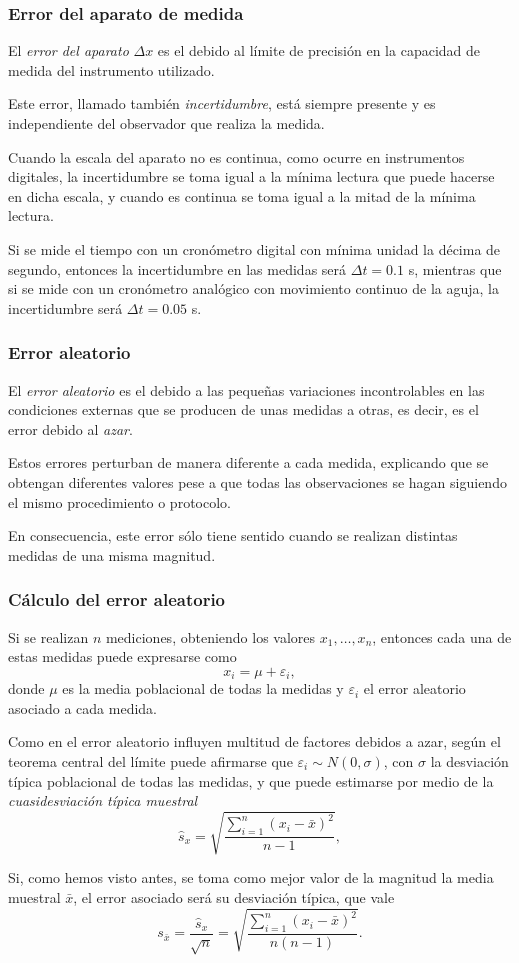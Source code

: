\begin{frame}
	\frametitle{Error del aparato de medida }
	El \emph{error del aparato} $\Delta x$ es el debido al límite de precisión en la capacidad de medida del instrumento
	utilizado. 
	
	Este error, llamado también \emph{incertidumbre}, está siempre presente y es independiente del observador
	que realiza la medida.
	
	Cuando la escala del aparato no es continua, como ocurre en instrumentos digitales, la incertidumbre se toma igual a la
	mínima lectura que puede hacerse en dicha escala, y cuando es continua se toma igual a la mitad de la mínima lectura.
	
	 Si se mide el tiempo con un cronómetro digital con mínima unidad la décima de segundo,
	entonces la incertidumbre en las medidas será $\Delta t=0.1$ s, mientras que si se mide con un cronómetro analógico con
	movimiento continuo de la aguja, la incertidumbre será $\Delta t=0.05$ s.
\end{frame}


\begin{frame}
	\frametitle{Error aleatorio}
	El \emph{error aleatorio} es el debido a las pequeñas variaciones incontrolables en las condiciones externas que se
	producen de unas medidas a otras, es decir, es el error debido al \emph{azar}. 
	
	Estos errores perturban de manera diferente a cada medida, explicando que se obtengan diferentes valores pese a que
	todas las observaciones se hagan siguiendo el mismo procedimiento o protocolo.
	
	En consecuencia, este error sólo tiene sentido cuando se realizan distintas medidas de una misma magnitud. 
\end{frame}


\begin{frame}
	\frametitle{Cálculo del error aleatorio}
	Si se realizan $n$ mediciones, obteniendo los valores $x_1,\ldots,x_n$, entonces cada una de estas medidas puede
	expresarse como
	\[
		x_i = \mu + \varepsilon_i, 
	\]
	donde $\mu$ es la media poblacional de todas la medidas y $\varepsilon_i$ el error aleatorio asociado a cada medida.
	
	Como en el error aleatorio influyen multitud de factores debidos a azar, según el teorema central del límite puede
	afirmarse que $\varepsilon_i\sim N(0,\sigma)$, con $\sigma$ la desviación típica poblacional de todas las medidas, y que
	puede estimarse por medio de la
	\emph{cuasidesviación típica muestral}
	\[
		\hat{s}_x = \sqrt{\frac{\sum_{i=1}^n (x_i-\bar x)^2}{n-1}}, 
	\]
	
	Si, como hemos visto antes, se toma como mejor valor de la magnitud la media muestral $\bar x$, el error
	asociado será su desviación típica, que vale
	\[
		s_{\bar x} = \frac{\hat{s}_x}{\sqrt n} = \sqrt{\frac{\sum_{i=1}^n (x_i-\bar x)^2}{n(n-1)}}.
	\]
\end{frame}


